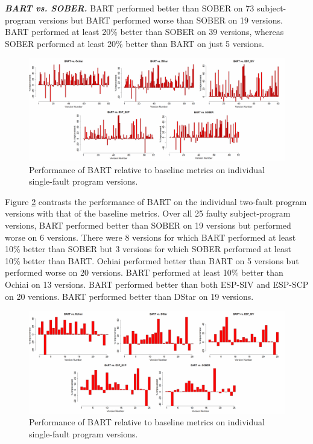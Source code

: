 \textit{\textbf{ BART vs. SOBER.}}  BART performed better than SOBER on 73 subject-program versions but BART performed worse than SOBER on 19 versions.  BART performed at least 20\% better than SOBER on 39 versions, whereas SOBER performed at least 20\% better than BART on just 5 versions.

\begin{figure}
\centering
\includegraphics[width=\textwidth]{chapter4_BART_VS_Base.pdf}
\caption{Performance of BART relative to baseline metrics on individual single-fault program versions.}
\label{BART_VS_Base}
\end{figure}

Figure \ref{BART_VS_Base_M} contrasts the performance of BART on the individual two-fault program versions with that of the baseline metrics.  Over all 25 faulty subject-program versions, BART performed better than SOBER on 19 versions but performed worse on 6 versions.  There were 8 versions for which BART performed at least 10\% better than SOBER but 3 versions for which SOBER performed at least 10\% better than BART.  Ochiai performed better than BART on 5 versions but performed worse on 20 versions. BART performed at least 10\% better than Ochiai on 13 versions. BART performed better than both ESP-SIV and ESP-SCP on 20 versions.   BART performed better than DStar on 19 versions.

\begin{figure}
\centering
\includegraphics[width=\textwidth]{chapter4_BARTvsBase_M.pdf}
\caption{Performance of BART relative to baseline metrics on individual single-fault program versions.}
\label{BART_VS_Base_M}
\end{figure}


